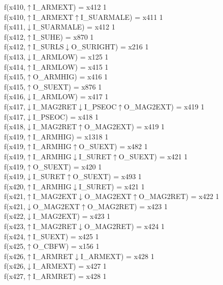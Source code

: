 f(x410,$\uparrow$I\_ARMEXT) = x412 {1} \\
f(x410,$\uparrow$I\_ARMEXT$\uparrow$I\_SUARMALE) = x411 {1} \\
f(x411,$\downarrow$I\_SUARMALE) = x412 {1} \\
f(x412,$\uparrow$I\_SUHE) = x870 {1} \\
f(x412,$\uparrow$I\_SURLS$\downarrow$O\_SURIGHT) = x216 {1} \\
f(x413,$\downarrow$I\_ARMLOW) = x125 {1} \\
f(x414,$\uparrow$I\_ARMLOW) = x415 {1} \\
f(x415,$\uparrow$O\_ARMHIG) = x416 {1} \\
f(x415,$\uparrow$O\_SUEXT) = x876 {1} \\
f(x416,$\downarrow$I\_ARMLOW) = x417 {1} \\
f(x417,$\downarrow$I\_MAG2RET$\downarrow$I\_PSEOC$\uparrow$O\_MAG2EXT) = x419 {1} \\
f(x417,$\downarrow$I\_PSEOC) = x418 {1} \\
f(x418,$\downarrow$I\_MAG2RET$\uparrow$O\_MAG2EXT) = x419 {1} \\
f(x419,$\uparrow$I\_ARMHIG) = x1318 {1} \\
f(x419,$\uparrow$I\_ARMHIG$\uparrow$O\_SUEXT) = x482 {1} \\
f(x419,$\uparrow$I\_ARMHIG$\downarrow$I\_SURET$\uparrow$O\_SUEXT) = x421 {1} \\
f(x419,$\uparrow$O\_SUEXT) = x420 {1} \\
f(x419,$\downarrow$I\_SURET$\uparrow$O\_SUEXT) = x493 {1} \\
f(x420,$\uparrow$I\_ARMHIG$\downarrow$I\_SURET) = x421 {1} \\
f(x421,$\uparrow$I\_MAG2EXT$\downarrow$O\_MAG2EXT$\uparrow$O\_MAG2RET) = x422 {1} \\
f(x421,$\downarrow$O\_MAG2EXT$\uparrow$O\_MAG2RET) = x423 {1} \\
f(x422,$\downarrow$I\_MAG2EXT) = x423 {1} \\
f(x423,$\uparrow$I\_MAG2RET$\downarrow$O\_MAG2RET) = x424 {1} \\
f(x424,$\uparrow$I\_SUEXT) = x425 {1} \\
f(x425,$\uparrow$O\_CBFW) = x156 {1} \\
f(x426,$\uparrow$I\_ARMRET$\downarrow$I\_ARMEXT) = x428 {1} \\
f(x426,$\downarrow$I\_ARMEXT) = x427 {1} \\
f(x427,$\uparrow$I\_ARMRET) = x428 {1} \\
